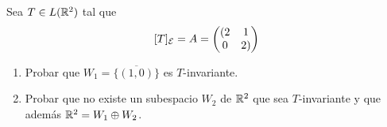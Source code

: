 \item Sea $T\in L(\mathbb{R}^2)$ tal que \[[T]_{\mathcal{E}}=A=\begin{pmatrix}
        (2&1\\0&2)
    \end{pmatrix}\]
    \begin{enumerate}
        \item Probar que $W_1=\overline{\{(1,0)\}}$ es $T$-invariante.
            \begin{mdframed}[style=s]
                
            \end{mdframed}
        \item Probar que no existe un subespacio $W_2$ de $\mathbb{R}^2$ que sea $T$-invariante y que además $\mathbb{R}^2=W_1 \oplus W_2$.
            \begin{mdframed}[style=s]
                
            \end{mdframed}
    \end{enumerate}
